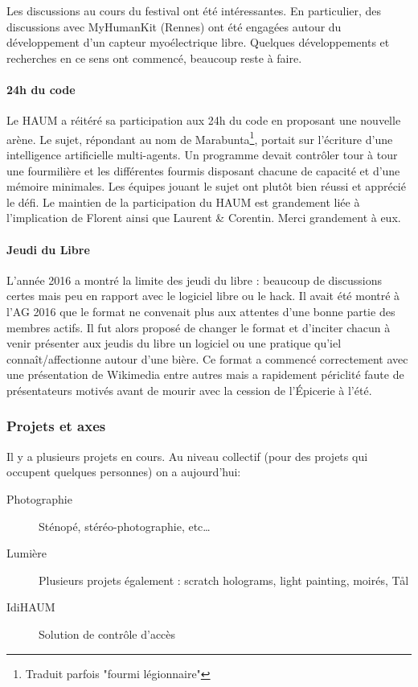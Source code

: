 \documentclass[11pt]{article}
\begin{document}
Les discussions au cours du festival ont été intéressantes. En particulier, des
discussions avec MyHumanKit (Rennes) ont été engagées autour du développement d'un capteur
myoélectrique libre. Quelques développements et recherches en ce sens ont commencé,
beaucoup reste à faire.

\paragraph{24h du code} Le HAUM a réitéré sa participation aux 24h du code en proposant
une nouvelle arène. Le sujet, répondant au nom de Marabunta\footnote{Traduit parfois
"fourmi légionnaire"}, portait sur l'écriture d'une intelligence artificielle
multi-agents. Un programme devait contrôler tour à tour une fourmilière et les différentes
fourmis disposant chacune de capacité et d'une mémoire minimales. Les équipes jouant le
sujet ont plutôt bien réussi et apprécié le défi. Le maintien de la participation du HAUM
est grandement liée à l'implication de Florent ainsi que Laurent \& Corentin. Merci
grandement à eux.

\paragraph{Jeudi du Libre} L'année 2016 a montré la limite des jeudi du libre : beaucoup
de discussions certes mais peu en rapport avec le logiciel libre ou le hack. Il avait été
montré à l'AG 2016 que le format ne convenait plus aux attentes d'une bonne partie des
membres actifs. Il fut alors proposé de changer le format et d'inciter chacun à venir
présenter aux jeudis du libre un logiciel ou une pratique qu'iel connaît/affectionne
autour d'une bière. Ce format a commencé correctement avec une présentation de Wikimedia
entre autres mais a rapidement périclité faute de présentateurs motivés avant de mourir
avec la cession de l'Épicerie à l'été.

\subsubsection{Projets et axes}

Il y a plusieurs projets en cours. Au niveau collectif (pour des projets qui occupent
quelques personnes) on a aujourd'hui:

\begin{description}
	\item[Photographie] Sténopé, stéréo-photographie, etc\ldots
	\item[Lumière] Plusieurs projets également : scratch holograms, light painting,  moirés, Tål
	\item[IdiHAUM] Solution de contrôle d'accès
\end{description}
\end{document}

